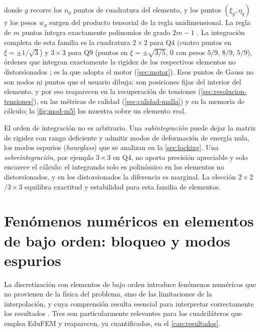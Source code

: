 donde $g$ recorre los $n_g$ puntos de cuadratura del elemento, y los puntos $(\xi_g,\eta_g)$ y los pesos $w_g$ surgen del producto tensorial de la regla unidimensional. La regla de $m$ puntos integra exactamente polinomios de grado $2m-1$ \autocites[pp.~141-142]{hughes2000fem}[p.~161]{zienkiewicz2013fem}. La integración completa de esta familia es la cuadratura $2\times2$ para Q4 (cuatro puntos en $\xi = \pm 1/\sqrt{3}$) y $3\times3$ para Q9 (puntos en $\xi = \pm\sqrt{3/5},\,0$ con pesos $5/9,\,8/9,\,5/9$), órdenes que integran exactamente la rigidez de los respectivos elementos no distorsionados \autocites[pp.~221-222]{hughes2000fem}[p.~470]{bathe2014fem}; es la que adopta el motor (\autoref{sec:motor}). Esos puntos de Gauss no son nodos ni puntos que el usuario dibuja: son posiciones fijas del interior del elemento, y por eso reaparecen en la recuperación de tensiones (\autoref{sec:resolucion-tensiones}), en las métricas de calidad (\autoref{sec:calidad-malla}) y en la memoria de cálculo; la \autoref{fig:mod-m5} los muestra sobre un elemento real.

El orden de integración no es arbitrario. Una \emph{subintegración} puede dejar la matriz de rigidez con rango deficiente y admitir modos de deformación de energía nula, los modos espurios (\emph{hourglass}) que se analizan en la \autoref{sec:locking}. Una \emph{sobreintegración}, por ejemplo $3\times3$ en Q4, no aporta precisión apreciable y solo encarece el cálculo: el integrando solo es polinómico en los elementos no distorsionados, y en los distorsionados la diferencia es marginal. La elección $2\times2$/$3\times3$ equilibra exactitud y estabilidad para esta familia de elementos.

\section{Fenómenos numéricos en elementos de bajo orden: bloqueo y modos espurios}
\label{sec:locking}

La discretización con elementos de bajo orden introduce fenómenos numéricos que no provienen de la física del problema, sino de las limitaciones de la interpolación, y cuya comprensión resulta esencial para interpretar correctamente los resultados \autocite{cook2002concepts,hughes2000fem,bathe2014fem}. Tres son particularmente relevantes para los cuadriláteros que emplea EduFEM y reaparecen, ya cuantificados, en el \autoref{cap:resultados}.

